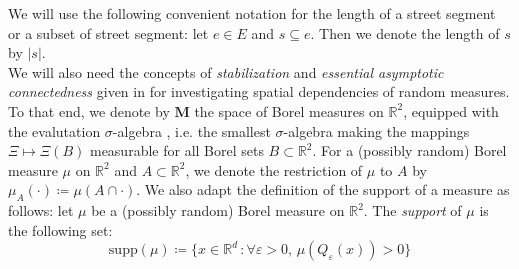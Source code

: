 \documentclass[10pt,a4paper]{amsart}
\theoremstyle{exampstyle}
\theoremstyle{exampnotations}
\begin{document}
\indent We will use the following convenient notation for the length of a street segment or a subset of street segment: let $e \in E$ and $s \subseteq e$. Then we denote the length of $s$ by $\vert s \vert$. \\

We will also need the concepts of \emph{stabilization} and \emph{essential asymptotic connectedness} given in \cite{hirsch2018continuum} for investigating spatial dependencies of random measures. \\
To that end, we denote by $\mathbf{M}$ the space of Borel measures on $\mathbb{R}^{2}$, equipped with the evalutation $\sigma$-algebra \cite[Section 13.1]{last2017lectures}, i.e. the smallest $\sigma$-algebra making the mappings $\Xi \mapsto \Xi(B)$ measurable for all Borel sets $B \subset \mathbb{R}^{2}$. For a (possibly random) Borel measure $\mu$ on $\mathbb{R}^{2}$ and $A \subset \mathbb{R}^{2}$, we denote the restriction of $\mu$ to $A$ by $\mu_A(\cdot) \coloneqq \mu(A \cap \cdot)$. We also adapt the definition of the support of a measure as follows: let $\mu$ be a (possibly random) Borel measure on $\mathbb{R}^{2}$. The \emph{support} of $\mu$ is the following set:
$$\text{supp}(\mu) \coloneqq \lbrace x \in \mathbb{R}^{d} \, : \forall \varepsilon > 0, \,  \mu(Q_{\varepsilon}(x)) > 0 \rbrace$$
\end{document}
